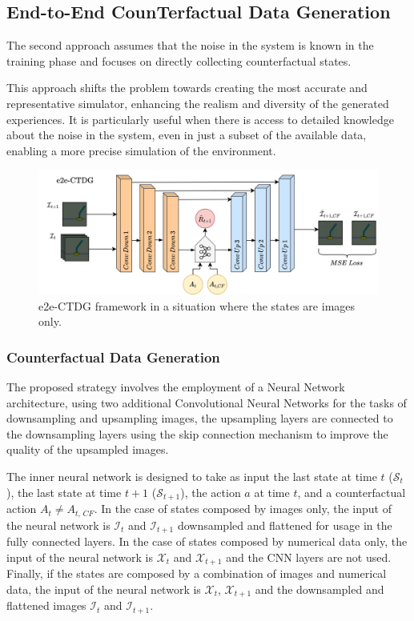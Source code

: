 \subsection{End-to-End CounTerfactual Data Generation}
\label{sec:e2e}

The second approach assumes that the noise in the system is known
in the training phase and focuses on directly collecting
counterfactual states.

This approach shifts the problem towards creating the most
accurate and representative simulator, enhancing the
realism and diversity of the generated experiences.
It is particularly useful when there is access to detailed
knowledge about the noise in the system,
even in just a subset of the available data, enabling a more
precise simulation of the environment.

\begin{figure}[ht]
    \centering
    \includegraphics[width=\textwidth]{figures/ch4/2.e2e.png}
    \caption{e2e-CTDG framework in a situation where the states are
    images only.}
    \label{fig:e2e}
\end{figure}

\subsubsection{Counterfactual Data Generation}

The proposed strategy involves the employment of a Neural Network
architecture, using two additional Convolutional Neural Networks
for the tasks of downsampling and upsampling images,
the upsampling layers are connected to the downsampling layers
using the skip connection mechanism to improve the quality of the
upsampled images.

The inner neural network is designed to take as input the last state at
time $t$ ($\mathcal{S}_{t}$), the last state at time $t+1$
($\mathcal{S}_{t+1}$), the action $a$ at time $t$,
and a counterfactual action $A_t \neq A_{t,\, CF}$.
In the case of states composed by images only,
the input of the neural network is $\mathcal{I}_{t}$ and $\mathcal{I}_{t+1}$
downsampled and flattened for usage in the fully connected layers.
In the case of states composed by numerical data only,
the input of the neural network is $\mathcal{X}_{t}$ and $\mathcal{X}_{t+1}$
and the CNN layers are not used.
Finally, if the states are composed by a combination of images
and numerical data,
the input of the neural network is $\mathcal{X}_{t}$, $\mathcal{X}_{t+1}$ and
the downsampled and flattened images $\mathcal{I}_{t}$ and $\mathcal{I}_{t+1}$.

